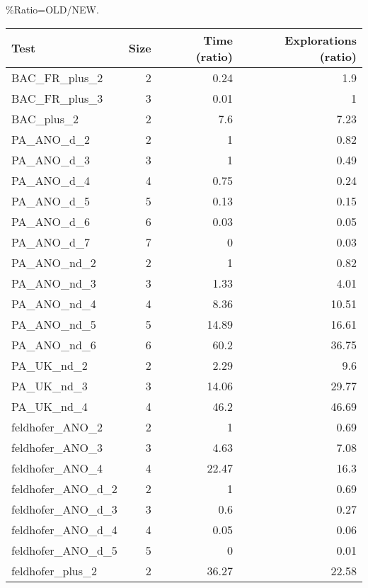 \%Ratio=OLD/NEW.
\begin{tabular}{lrrr}
\hline
  Test             &   Size &   Time (ratio) &   Explorations (ratio) \\
\hline
 BAC\_FR\_plus\_2     &      2 &           0.24 &                   1.9  \\
 BAC\_FR\_plus\_3     &      3 &           0.01 &                   1    \\
 BAC\_plus\_2        &      2 &           7.6  &                   7.23 \\
 PA\_ANO\_d\_2        &      2 &           1    &                   0.82 \\
 PA\_ANO\_d\_3        &      3 &           1    &                   0.49 \\
 PA\_ANO\_d\_4        &      4 &           0.75 &                   0.24 \\
 PA\_ANO\_d\_5        &      5 &           0.13 &                   0.15 \\
 PA\_ANO\_d\_6        &      6 &           0.03 &                   0.05 \\
 PA\_ANO\_d\_7        &      7 &           0    &                   0.03 \\
 PA\_ANO\_nd\_2       &      2 &           1    &                   0.82 \\
 PA\_ANO\_nd\_3       &      3 &           1.33 &                   4.01 \\
 PA\_ANO\_nd\_4       &      4 &           8.36 &                  10.51 \\
 PA\_ANO\_nd\_5       &      5 &          14.89 &                  16.61 \\
 PA\_ANO\_nd\_6       &      6 &          60.2  &                  36.75 \\
 PA\_UK\_nd\_2        &      2 &           2.29 &                   9.6  \\
 PA\_UK\_nd\_3        &      3 &          14.06 &                  29.77 \\
 PA\_UK\_nd\_4        &      4 &          46.2  &                  46.69 \\
 feldhofer\_ANO\_2   &      2 &           1    &                   0.69 \\
 feldhofer\_ANO\_3   &      3 &           4.63 &                   7.08 \\
 feldhofer\_ANO\_4   &      4 &          22.47 &                  16.3  \\
 feldhofer\_ANO\_d\_2 &      2 &           1    &                   0.69 \\
 feldhofer\_ANO\_d\_3 &      3 &           0.6  &                   0.27 \\
 feldhofer\_ANO\_d\_4 &      4 &           0.05 &                   0.06 \\
 feldhofer\_ANO\_d\_5 &      5 &           0    &                   0.01 \\
 feldhofer\_plus\_2  &      2 &          36.27 &                  22.58 \\
\hline
\end{tabular}